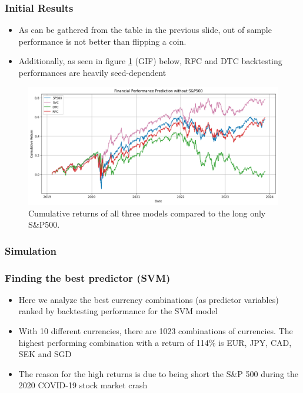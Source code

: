 \documentclass{beamer}
\begin{document}
\begin{frame}
\frametitle{Initial Results}
\begin{itemize}
\item As can be gathered from the table in the previous slide, out of sample performance is not better than flipping a coin. \item Additionally, as seen in figure \ref{fig: cumulative returns} (GIF) below, RFC and DTC backtesting performances are heavily seed-dependent
\end{itemize}
\begin{figure}[h!]
\begin{center}
  \includegraphics[width=0.7\columnwidth]{images/first_visualization.png}
  \caption[Model return comparison]{Cumulative returns of all three models compared to the long only S\&P500.}
  \end{center}
  \label{fig: cumulative returns}
\end{figure}
\end{frame}

\begin{frame}
\frametitle{Simulation}
\end{frame}

\begin{frame}
\frametitle{Finding the best predictor (SVM)}
\begin{itemize}
    \item Here we analyze the best currency combinations (as predictor variables) ranked by backtesting performance for the SVM model
    \item With 10 different currencies, there are 1023 combinations of currencies. The highest performing combination with a return of 114\% is EUR, JPY, CAD, SEK and SGD
    \item The reason for the high returns is due to being short the S\&P 500 during the 2020 COVID-19 stock market crash
    
\end{itemize}
\end{frame}
\end{document}
